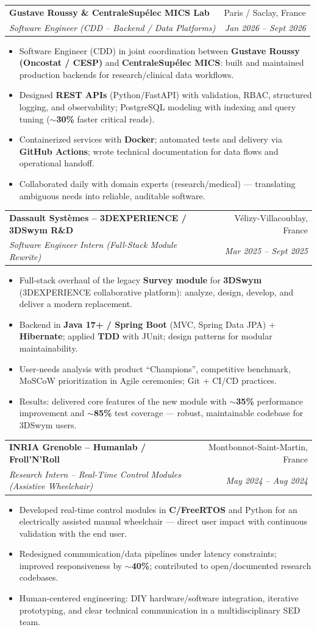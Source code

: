\documentclass[letterpaper,10.5pt]{article}
\makeatletter
\newcommand{\resumeItem}[1]{\item\small{#1 \vspace{-1.5pt}}}
\newcommand{\resumeSubheading}[4]{
  \vspace{-1pt}\item
    \begin{tabular*}{0.97\textwidth}[t]{l@{\extracolsep{\fill}}r}
      \textbf{#1} & #2 \\
      \textit{\small#3} & \textit{\small #4} \\
    \end{tabular*}\vspace{-5pt}
}
\newcommand{\resumeItemListStart}{\begin{itemize}[leftmargin=0.18in]}
\newcommand{\resumeItemListEnd}{\end{itemize}\vspace{-3pt}}
\makeatother
\begin{document}
  \resumeSubheading
    {Gustave Roussy \& CentraleSup\'elec MICS Lab}{Paris / Saclay, France}
    {Software Engineer (CDD -- Backend / Data Platforms)}{Jan 2026 -- Sept 2026}
    \resumeItemListStart
      \resumeItem{Software Engineer (CDD) in joint coordination between \textbf{Gustave Roussy (Oncostat / CESP)} and \textbf{CentraleSup\'elec MICS}: built and maintained production backends for research/clinical data workflows.}
      \resumeItem{Designed \textbf{REST APIs} (Python/FastAPI) with validation, RBAC, structured logging, and observability; PostgreSQL modeling with indexing and query tuning (\textbf{$\sim$30\%} faster critical reads).}
      \resumeItem{Containerized services with \textbf{Docker}; automated tests and delivery via \textbf{GitHub Actions}; wrote technical documentation for data flows and operational handoff.}
      \resumeItem{Collaborated daily with domain experts (research/medical) --- translating ambiguous needs into reliable, auditable software.}
    \resumeItemListEnd

  \resumeSubheading
    {Dassault Syst\`emes -- 3DEXPERIENCE / 3DSwym R\&D}{V\'elizy-Villacoublay, France}
    {Software Engineer Intern (Full-Stack Module Rewrite)}{Mar 2025 -- Sept 2025}
    \resumeItemListStart
      \resumeItem{Full-stack overhaul of the legacy \textbf{Survey module} for \textbf{3DSwym} (3DEXPERIENCE collaborative platform): analyze, design, develop, and deliver a modern replacement.}
      \resumeItem{Backend in \textbf{Java 17+ / Spring Boot} (MVC, Spring Data JPA) + \textbf{Hibernate}; applied \textbf{TDD} with JUnit; design patterns for modular maintainability.}
      \resumeItem{User-needs analysis with product ``Champions'', competitive benchmark, MoSCoW prioritization in Agile ceremonies; Git + CI/CD practices.}
      \resumeItem{Results: delivered core features of the new module with \textbf{$\sim$35\%} performance improvement and \textbf{$\sim$85\%} test coverage --- robust, maintainable codebase for 3DSwym users.}
    \resumeItemListEnd

  \resumeSubheading
    {INRIA Grenoble -- Humanlab / Froll'N'Roll}{Montbonnot-Saint-Martin, France}
    {Research Intern -- Real-Time Control Modules (Assistive Wheelchair)}{May 2024 -- Aug 2024}
    \resumeItemListStart
      \resumeItem{Developed real-time control modules in \textbf{C/FreeRTOS} and Python for an electrically assisted manual wheelchair --- direct user impact with continuous validation with the end user.}
      \resumeItem{Redesigned communication/data pipelines under latency constraints; improved responsiveness by \textbf{$\sim$40\%}; contributed to open/documented research codebases.}
      \resumeItem{Human-centered engineering: DIY hardware/software integration, iterative prototyping, and clear technical communication in a multidisciplinary SED team.}
    \resumeItemListEnd
\end{document}
